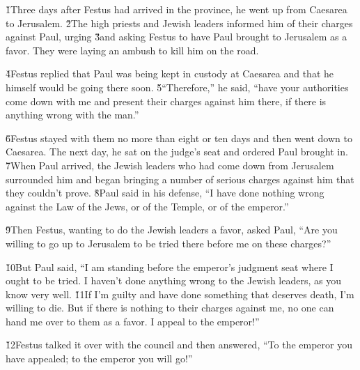 \v{1}Three days after Festus had arrived in the province, he went up from Caesarea to Jerusalem. \v{2}The high priests and Jewish leaders informed him of their charges against Paul, urging \v{3}and asking Festus to have Paul brought to Jerusalem as a favor. They were laying an ambush to kill him on the road.

\v{4}Festus replied that Paul was being kept in custody at Caesarea and that he himself would be going there soon. \v{5}``Therefore,'' he said, ``have your authorities come down with me and present their charges against him there, if there is anything wrong with the man.''

\v{6}Festus stayed with them no more than eight or ten days and then went down to Caesarea. The next day, he sat on the judge's seat and ordered Paul brought in. \v{7}When Paul arrived, the Jewish leaders who had come down from Jerusalem surrounded him and began bringing a number of serious charges against him that they couldn't prove. \v{8}Paul said in his defense, ``I have done nothing wrong against the Law of the Jews, or of the Temple, or of the emperor.''

\v{9}Then Festus, wanting to do the Jewish leaders a favor, asked Paul, ``Are you willing to go up to Jerusalem to be tried there before me on these charges?''

\v{10}But Paul said, ``I am standing before the emperor's judgment seat where I ought to be tried. I haven't done anything wrong to the Jewish leaders, as you know very well. \v{11}If I'm guilty and have done something that deserves death, I'm willing to die. But if there is nothing to their charges against me, no one can hand me over to them as a favor. I appeal to the emperor!''

\v{12}Festus talked it over with the council and then answered, ``To the emperor you have appealed; to the emperor you will go!''


